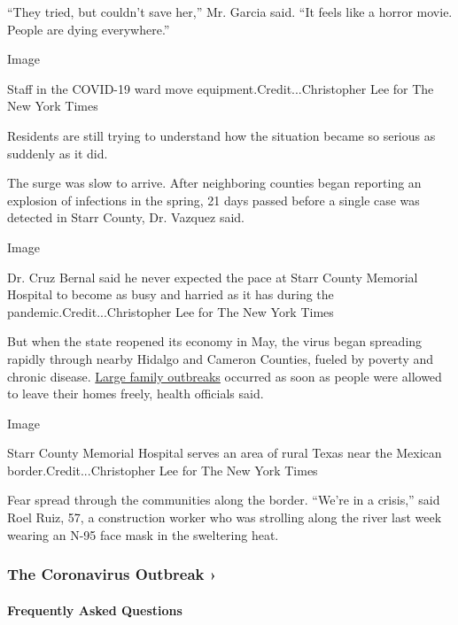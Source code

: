 ``They tried, but couldn't save her,'' Mr. Garcia said. ``It feels like
a horror movie. People are dying everywhere.''

Image

Staff in the COVID-19 ward move equipment.Credit...Christopher Lee for
The New York Times

Residents are still trying to understand how the situation became so
serious as suddenly as it did.

The surge was slow to arrive. After neighboring counties began reporting
an explosion of infections in the spring, 21 days passed before a single
case was detected in Starr County, Dr. Vazquez said.

Image

Dr. Cruz Bernal said he never expected the pace at Starr County Memorial
Hospital to become as busy and harried as it has during the
pandemic.Credit...Christopher Lee for The New York Times

But when the state reopened its economy in May, the virus began
spreading rapidly through nearby Hidalgo and Cameron Counties, fueled by
poverty and chronic disease.
\href{https://www.nytimes3xbfgragh.onion/2020/07/14/us/coronavirus-texas-rio-grande-valley-border.html}{Large
family outbreaks} occurred as soon as people were allowed to leave their
homes freely, health officials said.

Image

Starr County Memorial Hospital serves an area of rural Texas near the
Mexican border.Credit...Christopher Lee for The New York Times

Fear spread through the communities along the border. ``We're in a
crisis,'' said Roel Ruiz, 57, a construction worker who was strolling
along the river last week wearing an N-95 face mask in the sweltering
heat.

\href{https://www.nytimes3xbfgragh.onion/news-event/coronavirus?action=click\&pgtype=Article\&state=default\&region=MAIN_CONTENT_3\&context=storylines_faq}{}

\hypertarget{the-coronavirus-outbreak-}{%
\subsubsection{The Coronavirus Outbreak
›}\label{the-coronavirus-outbreak-}}

\hypertarget{frequently-asked-questions}{%
\paragraph{Frequently Asked
Questions}\label{frequently-asked-questions}}

